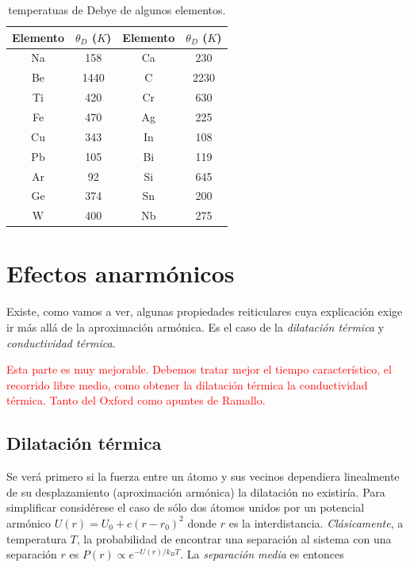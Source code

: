 \begin{table}[h!] \centering
\begin{tabular}{cccc}
    Elemento & $\theta_D$ ($K$) & Elemento & $\theta_D$ ($K$) \\ \hline
    Na & 158 & Ca & 230 \\
    Be & 1440 & C & 2230 \\
    Ti & 420 & Cr & 630 \\
    Fe & 470 & Ag & 225 \\
    Cu & 343 & In & 108 \\
    Pb & 105 & Bi & 119 \\
    Ar & 92 & Si & 645 \\
    Ge & 374 & Sn & 200 \\
    W & 400 & Nb & 275
\end{tabular}
\caption{temperatuas de Debye de algunos elementos.}
\label{Tab:05-01}
\end{table}

\section{Efectos anarmónicos}

Existe, como vamos a ver, algunas propiedades reiticulares cuya explicación exige ir más allá de la aproximación armónica. Es el caso de la \textit{dilatación térmica} y  \textit{conductividad térmica}.

\begin{Anotacion}
	\textcolor{red}{Esta parte es muy mejorable. Debemos tratar mejor el tiempo característico, el recorrido libre medio, como obtener la dilatación térmica  la conductividad térmica. Tanto del Oxford como apuntes de Ramallo.}
\end{Anotacion}


\subsection{Dilatación térmica}

Se verá primero si la fuerza entre un átomo y sus vecinos dependiera linealmente de su desplazamiento (aproximación armónica) la dilatación no existiría. Para simplificar considérese el caso de sólo dos átomos unidos por un potencial armónico $U(r) = U_0 + c(r-r_0)^2$ donde $r$ es la interdistancia. \textit{Clásicamente}, a temperatura $T$, la probabilidad de encontrar una separación al sistema con una separación $r$ es $P(r)\propto e^{-U(r)/k_BT}$. La \textit{separación media} es entonces


